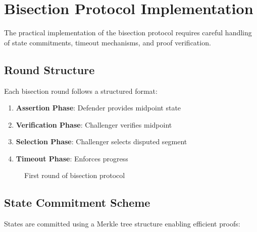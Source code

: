 \section{Bisection Protocol Implementation}


The practical implementation of the bisection protocol requires careful handling of state commitments, timeout mechanisms, and proof verification.

\subsection{Round Structure}

Each bisection round follows a structured format:

\begin{enumerate}
    \item \textbf{Assertion Phase}: Defender provides midpoint state
    \item \textbf{Verification Phase}: Challenger verifies midpoint
    \item \textbf{Selection Phase}: Challenger selects disputed segment
    \item \textbf{Timeout Phase}: Enforces progress
\end{enumerate}

\begin{figure}[h]
\centering
{}
\caption{First round of bisection protocol}
\end{figure}

\subsection{State Commitment Scheme}

States are committed using a Merkle tree structure enabling efficient proofs:

